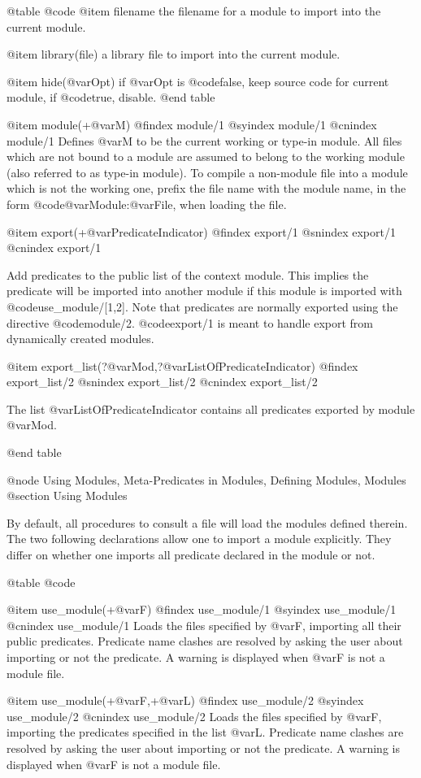 {{{{@table @code
@item filename
 the filename for a module to import into the current module.

@item library(file)
 a library file to import into the current module.

@item hide(@var{Opt})
 if @var{Opt} is @code{false}, keep source code for current module, if
@code{true}, disable.
@end table

@item module(+@var{M})
@findex module/1
@syindex module/1
@cnindex module/1
Defines @var{M} to be the current working or type-in module. All files
which are not bound to a module are assumed to belong to the working
module (also referred to as type-in module). To compile a non-module
file into a module which is not the working one, prefix the file name
with the module name, in the form @code{@var{Module}:@var{File}}, when
loading the file.

@item export(+@var{PredicateIndicator})
@findex export/1
@snindex export/1
@cnindex export/1

Add predicates to the public list of the context module. This implies
the predicate will be imported into another module if this module is
imported with @code{use_module/[1,2]}. Note that predicates are normally
exported using the directive @code{module/2}. @code{export/1} is meant
to handle export from dynamically created modules.

@item export_list(?@var{Mod},?@var{ListOfPredicateIndicator})
@findex export_list/2
@snindex export_list/2
@cnindex export_list/2

The list @var{ListOfPredicateIndicator} contains all predicates exported
by module @var{Mod}.

@end table

@node Using Modules, Meta-Predicates in Modules, Defining Modules, Modules
@section Using Modules

By default, all procedures to consult a file will load the modules
defined therein. The two following declarations allow one to import a
module explicitly. They differ on whether one imports all predicate
declared in the module or not.

@table @code

@item use_module(+@var{F})
@findex use_module/1
@syindex use_module/1
@cnindex use_module/1
Loads the files specified by @var{F}, importing all their public
predicates. Predicate name clashes are resolved by asking the user about
importing or not the predicate. A warning is displayed when @var{F} is
not a module file.

@item use_module(+@var{F},+@var{L})
@findex use_module/2
@syindex use_module/2
@cnindex use_module/2
Loads the files specified by @var{F}, importing the predicates specified
in the list @var{L}. Predicate name clashes are resolved by asking the
user about importing or not the predicate. A warning is displayed when
@var{F} is not a module file.

}}}}
